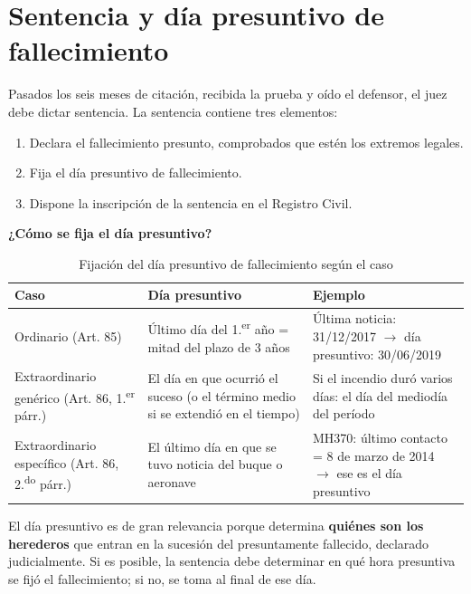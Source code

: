 \documentclass[12pt,oneside]{book}
\begin{document}
\section{Sentencia y día presuntivo de fallecimiento}

Pasados los seis meses de citación, recibida la prueba y oído el
defensor, el juez debe dictar sentencia. La sentencia contiene tres
elementos:

\begin{enumerate}
    \item Declara el fallecimiento presunto, comprobados que estén los extremos legales.
    \item Fija el día presuntivo de fallecimiento.
    \item Dispone la inscripción de la sentencia en el Registro Civil.
\end{enumerate}

\textbf{¿Cómo se fija el día presuntivo?}

\begin{table}[H]
\centering
\begin{tabularx}{\textwidth}{>{\raggedright\arraybackslash}X >{\raggedright\arraybackslash}X >{\raggedright\arraybackslash}X}
\toprule
\textbf{Caso} & \textbf{Día presuntivo} & \textbf{Ejemplo} \\
\midrule
Ordinario (Art. 85) & Último día del 1.\textsuperscript{er} año = mitad del plazo de 3 años & Última noticia: 31/12/2017 $\rightarrow$ día presuntivo: 30/06/2019 \\
Extraordinario genérico (Art. 86, 1.\textsuperscript{er} párr.) & El día en que ocurrió el suceso (o el término medio si se extendió en el tiempo) & Si el incendio duró varios días: el día del mediodía del período \\
Extraordinario específico (Art. 86, 2.\textsuperscript{do} párr.) & El último día en que se tuvo noticia del buque o aeronave & MH370: último contacto = 8 de marzo de 2014 $\rightarrow$ ese es el día presuntivo \\
\bottomrule
\end{tabularx}
\caption{Fijación del día presuntivo de fallecimiento según el caso}
\end{table}

El día presuntivo es de gran relevancia porque determina
\textbf{quiénes son los herederos} que entran en la sucesión del
presuntamente fallecido, declarado judicialmente. Si es posible, la
sentencia debe determinar en qué hora presuntiva se fijó el
fallecimiento; si no, se toma al final de ese día.
\end{document}
